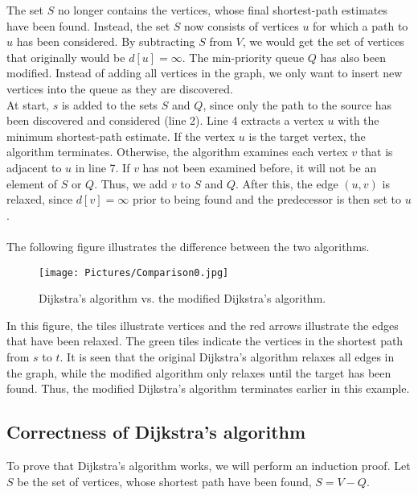 \documentclass[11pt]{article}
\begin{document}
\noindent The set $S$ no longer contains the vertices, whose final shortest-path estimates have been found. Instead, the set $S$ now consists of vertices $u$ for which a path to $u$ has been considered. By subtracting $S$ from $V$, we would get the set of vertices that originally would be $d[u]=\infty$. The min-priority queue $Q$ has also been modified. Instead of adding all vertices in the graph, we only want to insert new vertices into the queue as they are discovered.\\ 

\noindent At start, $s$ is added to the sets $S$ and $Q$, since only the path to the source has been discovered and considered (line 2). Line 4 extracts a vertex $u$ with the minimum shortest-path estimate. If the vertex $u$ is the target vertex, the algorithm terminates. Otherwise, the algorithm examines each vertex $v$ that is adjacent to $u$ in line 7. If $v$ has not been examined before, it will not be an element of $S$ or $Q$. Thus, we add $v$ to $S$ and $Q$. After this, the edge $(u,v)$ is relaxed, since $d[v]=\infty$ prior to being found and the predecessor is then set to $u$.\\\\
The following figure illustrates the difference between the two algorithms.\\
\begin{figure}[H]
\centering
\texttt{[image: Pictures/Comparison0.jpg]}
\caption{Dijkstra's algorithm vs. the modified Dijkstra's algorithm.}
\end{figure}

\noindent In this figure, the tiles illustrate vertices and the red arrows illustrate the edges that have been relaxed. The green tiles indicate the vertices in the shortest path from $s$ to $t$. It is seen that the original Dijkstra's algorithm relaxes all edges in the graph, while the modified algorithm only relaxes until the target has been found. Thus, the modified Dijkstra's algorithm terminates earlier in this example.


\subsection{Correctness of Dijkstra's algorithm}
To prove that Dijkstra's algorithm works, we will perform an induction proof. Let $S$ be the set of vertices, whose shortest path have been found, $S=V-Q$.\\
\end{document}
